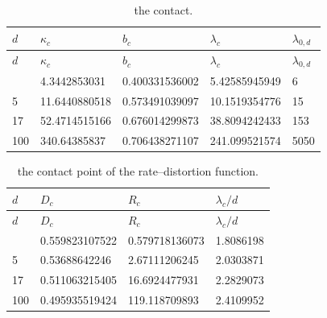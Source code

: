 \documentclass[
  11pt,
  a4paper,
]{article}
\begin{document}
\begin{longtable}[]{@{}lllll@{}}
\caption{the contact.}\tabularnewline
\toprule\noalign{}
\(d\) & \(\kappa_c\) & \(b_c\) & \(\lambda_c\) & \(\lambda_{0,\allowbreak{}d}\) \\
\midrule\noalign{}
\endfirsthead
\toprule\noalign{}
\(d\) & \(\kappa_c\) & \(b_c\) & \(\lambda_c\) & \(\lambda_{0,\allowbreak{}d}\) \\
\midrule\noalign{}
\endhead
\bottomrule\noalign{}
\endlastfoot
3 & 4.3442853031 & 0.400331536002 & 5.42585945949 & 6 \\
5 & 11.6440880518 & 0.573491039097 & 10.1519354776 & 15 \\
17 & 52.4714515166 & 0.676014299873 & 38.8094242433 & 153 \\
100 & 340.64385837 & 0.706438271107 & 241.099521574 & 5050 \\
\end{longtable}

\begin{longtable}[]{@{}llll@{}}
\caption{the contact point of the rate--distortion
function.}\tabularnewline
\toprule\noalign{}
\(d\) & \(D_c\) & \(R_c\) & \(\lambda_c/d\) \\
\midrule\noalign{}
\endfirsthead
\toprule\noalign{}
\(d\) & \(D_c\) & \(R_c\) & \(\lambda_c/d\) \\
\midrule\noalign{}
\endhead
\bottomrule\noalign{}
\endlastfoot
3 & 0.559823107522 & 0.579718136073 & 1.8086198 \\
5 & 0.53688642246 & 2.67111206245 & 2.0303871 \\
17 & 0.511063215405 & 16.6924477931 & 2.2829073 \\
100 & 0.495935519424 & 119.118709893 & 2.4109952 \\
\end{longtable}
\end{document}
